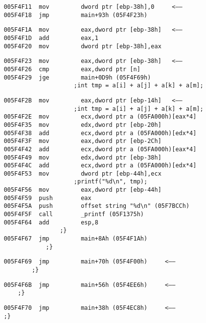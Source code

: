 \begin{lstlisting}
    005F4F11  mov         dword ptr [ebp-38h],0     <——
    005F4F18  jmp         main+93h (05F4F23h)  
\end{lstlisting}


\begin{lstlisting}
    005F4F1A  mov         eax,dword ptr [ebp-38h]   <——
    005F4F1D  add         eax,1  
    005F4F20  mov         dword ptr [ebp-38h],eax  
\end{lstlisting}


\begin{lstlisting}
    005F4F23  mov         eax,dword ptr [ebp-38h]   <——
    005F4F26  cmp         eax,dword ptr [n]  
    005F4F29  jge         main+0D9h (05F4F69h)  
                        ;int tmp = a[i] + a[j] + a[k] + a[m];
\end{lstlisting}


\begin{lstlisting}
    005F4F2B  mov         eax,dword ptr [ebp-14h]   <——
                        ;int tmp = a[i] + a[j] + a[k] + a[m];
    005F4F2E  mov         ecx,dword ptr a (05FA000h)[eax*4]  
    005F4F35  mov         edx,dword ptr [ebp-20h]  
    005F4F38  add         ecx,dword ptr a (05FA000h)[edx*4]  
    005F4F3F  mov         eax,dword ptr [ebp-2Ch]  
    005F4F42  add         ecx,dword ptr a (05FA000h)[eax*4]  
    005F4F49  mov         edx,dword ptr [ebp-38h]  
    005F4F4C  add         ecx,dword ptr a (05FA000h)[edx*4]  
    005F4F53  mov         dword ptr [ebp-44h],ecx  
                        ;printf("%d\n", tmp);
    005F4F56  mov         eax,dword ptr [ebp-44h]  
    005F4F59  push        eax  
    005F4F5A  push        offset string "%d\n" (05F7BCCh)  
    005F4F5F  call        _printf (05F1375h)  
    005F4F64  add         esp,8  
                    ;}
    005F4F67  jmp         main+8Ah (05F4F1Ah)  
                ;}
\end{lstlisting}


\begin{lstlisting}
    005F4F69  jmp         main+70h (05F4F00h)     <——
            ;}
\end{lstlisting}


\begin{lstlisting}
    005F4F6B  jmp         main+56h (05F4EE6h)     <——
        ;}
\end{lstlisting}


\begin{lstlisting}
    005F4F70  jmp         main+38h (05F4EC8h)     <——
    ;}
\end{lstlisting}


